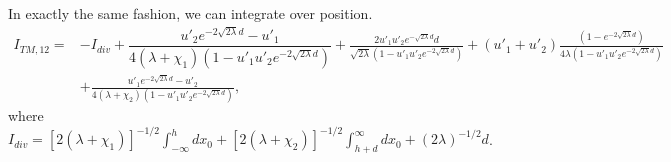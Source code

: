 
In exactly the same fashion, we can integrate over position.  
\begin{align}
I_{TM,12} =& -I_{div} + \dfrac{u'_2 e^{-2\sqrt{2\lambda}d}-u'_1}{4(\lambda+\chi_1)(1-u'_1u'_2 e^{-2\sqrt{2\lambda}d})} +\frac{2u'_1u'_2 e^{-\sqrt{2\lambda}d}d}{\sqrt{2\lambda}(1-u'_1u'_2 e^{-2\sqrt{2\lambda}d})} + (u'_1+u'_2)\frac{(1-e^{-2\sqrt{2\lambda}d})}{4\lambda(1-u'_1u'_2e^{-2\sqrt{2\lambda}d})}\nonumber\\
& +\frac{u'_1 e^{-2\sqrt{2\lambda}d} - u'_2}{4(\lambda+\chi_2)(1-u'_1u'_2 e^{-2\sqrt{2\lambda}d})},
\end{align}
where $I_{div} = [2(\lambda+\chi_1)]^{-1/2}\int_{-\infty}^h dx_0  +  [2(\lambda+\chi_2)]^{-1/2}\int_{h+d}^\infty dx_0  + (2\lambda)^{-1/2}d$.


